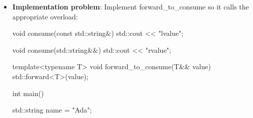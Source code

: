 \documentclass{report}
\begin{document}
\begin{itemize}
\begin{cppcode}
                template<typename T>
                void g(T arg) { ... }

                int x{5};
                f(x); g(x);
            \end{cppcode}
            \bigbreak \noindent 
            In the call to $g$, the type is deduced as \texttt{int}, whereas in $f$, the type is deduced as \texttt{int}\&. The fundamental difference in behavior exists to prevent silent, unintentional copying of objects while enabling perfect forwarding.
            \bigbreak \noindent 
            In C++, template type deduction rules are explicitly designed around the signature of the function parameter. The compiler treats T arg and T\&\& arg with two entirely different sets of rules when it encounters an lvalue.
        \item \textbf{Implementation problem}: Implement forward\_to\_consume so it calls the appropriate overload:
            \bigbreak \noindent 
            \begin{cppcode}
                void consume(const std::string&) {
                    std::cout << "lvalue\n";
                }

                void consume(std::string&&) {
                    std::cout << "rvalue\n";
                }

                template<typename T>
                void forward_to_consume(T&& value) {
                    std::forward<T>(value);
                }

                int main() {
                    std::string name = "Ada";

}
\end{cppcode}
\end{itemize}
\end{document}
